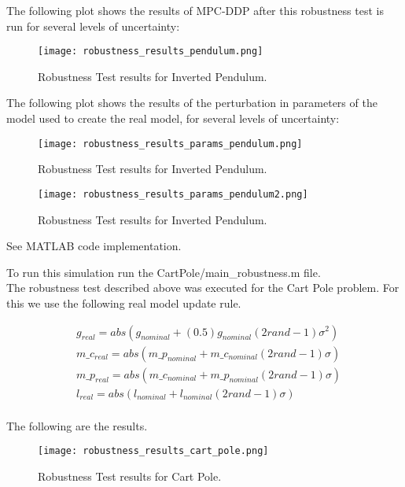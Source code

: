 \documentclass[11pt]{homework}
\begin{document}
\begin{arabicparts}
	The following plot shows the results of MPC-DDP after this robustness test is run for several levels of uncertainty:
	
		\begin{figure}[H]
			\centering
			\texttt{[image: robustness\_results\_pendulum.png]}
			\caption{Robustness Test results for Inverted Pendulum.}
		\end{figure}
		
		The following plot shows the results of the perturbation in parameters of the model used to create the real model, for several levels of uncertainty:
	
		\begin{figure}[H]
			\centering
			\texttt{[image: robustness\_results\_params\_pendulum.png]}
			\caption{Robustness Test results for Inverted Pendulum.}
		\end{figure}
		\begin{figure}[H]
			\centering
			\texttt{[image: robustness\_results\_params\_pendulum2.png]}
			\caption{Robustness Test results for Inverted Pendulum.}
		\end{figure}

		\newpage
		
\questionpart
See MATLAB code implementation.

To run this simulation run the CartPole/main\_robustness.m file. \\

		The robustness test described above was executed for the Cart Pole problem. For this we use the following real model update rule. 
		
		\begin{align*}
			& g_{real} = abs(g_{nominal} + (0.5)g_{nominal}(2rand - 1)\sigma^2) \\
			& m\_c_{real} = abs(m\_p_{nominal} + m\_c_{nominal}(2rand - 1)\sigma) \\
			& m\_p_{real} = abs(m\_c_{nominal} + m\_p_{nominal}(2rand - 1)\sigma) \\
			& l_{real} = abs(l_{nominal} + l_{nominal}(2rand - 1)\sigma) \\
		\end{align*}
		
		
		The following are the results. 
	
		\begin{figure}[H]
			\centering
			\texttt{[image: robustness\_results\_cart\_pole.png]}
			\caption{Robustness Test results for Cart Pole.}
		\end{figure}
		

\end{arabicparts}
\end{document}
